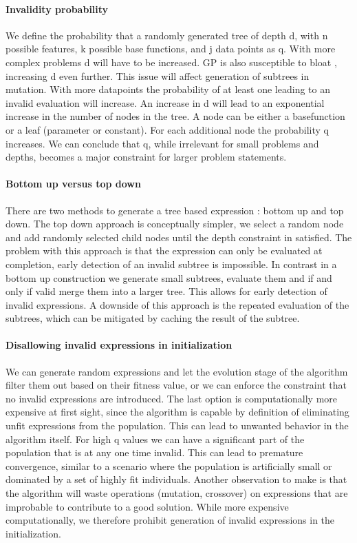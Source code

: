 \paragraph{Invalidity probability}
We define the probability that a randomly generated tree of depth d, with n possible features, k possible base functions, and j data points as q. With more complex problems d will have to be increased. GP is also susceptible to bloat \cite{GPBloat}, increasing d even further. This issue will affect generation of subtrees in mutation. With more datapoints the probability of at least one leading to an invalid evaluation will increase. An increase in d will lead to an exponential increase in the number of nodes in the tree. A node can be either a basefunction or a leaf (parameter or constant). For each additional node the probability q increases. We can conclude that q, while irrelevant for small problems and depths, becomes a major constraint for larger problem statements. 

\paragraph{Bottom up versus top down}
There are two methods to generate a tree based expression : bottom up and top down. The top down approach is conceptually simpler, we select a random node and add randomly selected child nodes until the depth constraint in satisfied. The problem with this approach is that the expression can only be evaluated at completion, early detection of an invalid subtree is impossible. 
In contrast in a bottom up construction we generate small subtrees, evaluate them and if and only if valid merge them into a larger tree. This allows for early detection of invalid expressions. A downside of this approach is the repeated evaluation of the subtrees, which can be mitigated by caching the result of the subtree.

\paragraph{Disallowing invalid expressions in initialization}
We can generate random expressions and let the evolution stage of the algorithm filter them out based on their fitness value, or we can enforce the constraint that no invalid expressions are introduced. The last option is computationally more expensive at first sight, since the algorithm is capable by definition of eliminating unfit expressions from the population. 
This can lead to unwanted behavior in the algorithm itself. For high q values we can have a significant part of the population that is at any one time invalid. This can lead to premature convergence, similar to a scenario where the population is artificially small or dominated by a set of highly fit individuals. Another observation to make is that the algorithm will waste operations (mutation, crossover) on expressions that are improbable to contribute to a good solution. 
While more expensive computationally, we therefore prohibit generation of invalid expressions in the initialization. 

